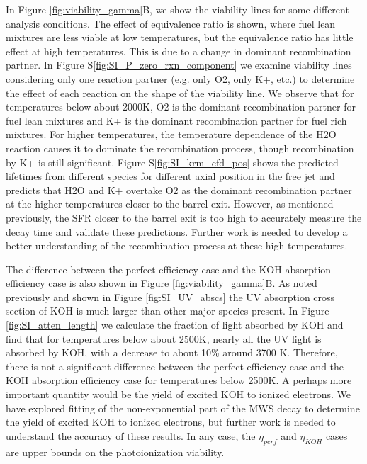 In Figure \ref{fig:viability_gamma}B, we show the viability lines for some different analysis conditions. The effect of equivalence ratio is shown, where fuel lean mixtures are less viable at low temperatures, but the equivalence ratio has little effect at high temperatures. This is due to a change in dominant recombination partner. In Figure S\ref{fig:SI_P_zero_rxn_component} we examine viability lines considering only one reaction partner (e.g. only O2, only K+, etc.) to determine the effect of each reaction on the shape of the viability line. We observe that for temperatures below about 2000K, O2 is the dominant recombination partner for fuel lean mixtures and K+ is the dominant recombination partner for fuel rich mixtures. For higher temperatures, the temperature dependence of the H2O reaction causes it to dominate the recombination process, though recombination by K+ is still significant. Figure S\ref{fig:SI_krm_cfd_pos} shows the predicted lifetimes from different species for different axial position in the free jet and predicts that H2O and K+ overtake O2 as the dominant recombination partner at the higher temperatures closer to the barrel exit. However, as mentioned previously, the SFR closer to the barrel exit is too high to accurately measure the decay time and validate these predictions. Further work is needed to develop a better understanding of the recombination process at these high temperatures.  

The difference between the perfect efficiency case and the KOH absorption efficiency case is also shown in Figure \ref{fig:viability_gamma}B. As noted previously and shown in Figure \ref{fig:SI_UV_abscs} the UV absorption cross section of KOH is much larger than other major species present. In Figure \ref*{fig:SI_atten_length} we calculate the fraction of light absorbed by KOH and find that for temperatures below about 2500K, nearly all the UV light is absorbed by KOH, with a decrease to about 10\% around 3700 K. Therefore, there is not a significant difference between the perfect efficiency case and the KOH absorption efficiency case for temperatures below 2500K. A perhaps more important quantity would be the yield of excited KOH to ionized electrons. We have explored fitting of the non-exponential part of the MWS decay to determine the yield of excited KOH to ionized electrons, but further work is needed to understand the accuracy of these results. In any case, the $\eta_{perf}$ and $\eta_{KOH}$ cases are upper bounds on the photoionization viability.  

